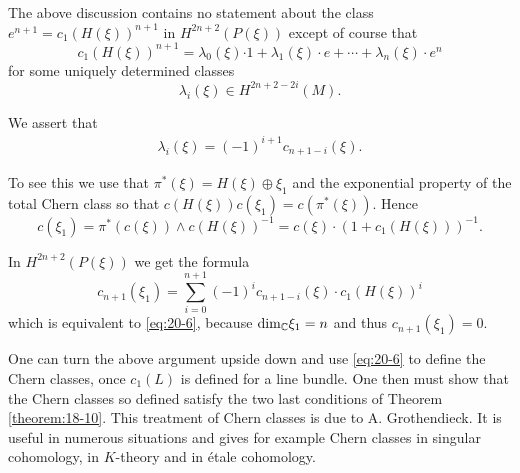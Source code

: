 The above discussion contains no statement about the class ${e}^{n + 1} = {c}_{1}{( H( \xi ) ) }^{n + 1}$ in $H^{{2n} + 2}( {P( \xi ) })$ 
except of course that
\[
  {c}_{1}{( H( \xi ) ) }^{n + 1} 
  = {\lambda }_{0}( \xi ) {\cdot 1} 
    + {\lambda }_{1}( \xi )\cdot e 
    + \cdots  
    + {\lambda }_{n}( \xi )\cdot {e}^{n}
\]
for some uniquely determined classes
\[
  {\lambda }_{i}( \xi )  \in  H^{{2n} + 2- {2i}}( M).
\]

We assert that
\begin{align}\label{eq:20-6}
  {\lambda }_{i}( \xi )  = {(-1) }^{i + 1}{c}_{n + 1- i}( \xi ).
\end{align}

To see this we use that ${\pi }^*( \xi )  = H( \xi )  \oplus  {\xi }_{1}$ and the exponential 
property of the total Chern class so that $c( {H( \xi ) }) c( {\xi }_{1})  = c( {{\pi }^*( \xi ) })$. 
Hence
\[
  c( {\xi }_{1})  
  = {\pi }^*( {c( \xi ) })  \land  c{( H( \xi ) ) }^{-1} 
  = c( \xi )  \cdot  {( 1 + {c}_{1}( H( \xi ) ) ) }^{-1}.
\]

In $H^{{2n} + 2}( {P( \xi ) })$ we get the formula
\[
  {c}_{n + 1}( {\xi }_{1})  
  = \mathop{\sum }\limits_{{i = 0}}^{{n + 1}}{(-1) }^{i}{c}_{n + 1- i}( \xi )  \cdot  {c}_{1}{( H( \xi ) ) }^{i}
\]
which is equivalent to \eqref{eq:20-6}, because ${\dim }_{\mathbb{C}}{\xi }_{1} = n$ and thus ${c}_{n + 1}( {\xi }_{1})  = 0$.

\begin{remark}\label{remark:20-3}
  One can turn the above argument upside down and use \eqref{eq:20-6} to define the Chern classes, 
  once ${c}_{1}( L)$ is defined for a line bundle. One then must show that the Chern classes 
  so defined satisfy the two last conditions of Theorem \ref{theorem:18-10}. This treatment of Chern classes is 
  due to A. Grothendieck. It is useful in numerous situations and gives for example Chern classes 
  in singular cohomology, in $K$-theory and in \'etale cohomology.  
\end{remark}

